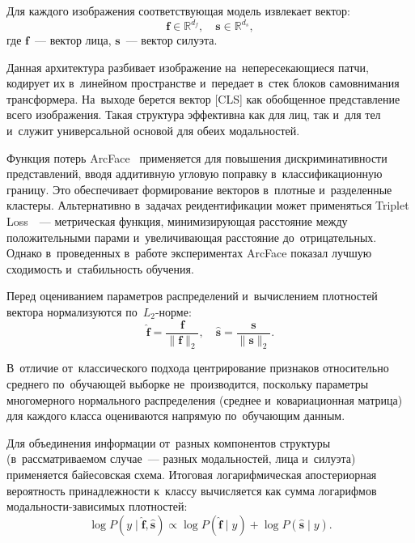 Для каждого изображения соответствующая модель извлекает вектор:
\begin{equation}\label{eq:ch2/embed}
    \mathbf{f}\in\mathbb{R}^{d_f},\quad \mathbf{s}\in\mathbb{R}^{d_s},
\end{equation}
где $\mathbf{f}$~--- вектор лица, $\mathbf{s}$~--- вектор силуэта.

Данная архитектура разбивает изображение на~непересекающиеся патчи,
кодирует их в~линейном пространстве и~передает в~стек
блоков самовнимания трансформера. На~выходе берется вектор [CLS]
как обобщенное представление всего изображения. Такая структура
эффективна как для лиц, так и~для тел и~служит универсальной
основой для обеих модальностей.

Функция потерь ArcFace~\cite{Deng2019arcface} применяется для
повышения дискриминативности представлений, вводя аддитивную угловую
поправку в~классификационную границу. Это обеспечивает формирование
векторов в~плотные и~разделенные кластеры. Альтернативно в~задачах
реидентификации может применяться Triplet
Loss~\cite{Hermans2017triplet}~--- метрическая функция, минимизирующая
расстояние между положительными парами и~увеличивающая расстояние
до~отрицательных. Однако в~проведенных в~работе экспериментах ArcFace
показал лучшую сходимость и~стабильность обучения.

Перед оцениванием параметров распределений и~вычислением плотностей вектора нормализуются по~$L_2$-норме:
\begin{equation}\label{eq:ch2/l2norm}
    \hat{\mathbf{f}}=\frac{\mathbf{f}}{\lVert\mathbf{f}\rVert_2},\quad \hat{\mathbf{s}}=\frac{\mathbf{s}}{\lVert\mathbf{s}\rVert_2}.
\end{equation}

В~отличие от~классического подхода центрирование признаков
относительно среднего по~обучающей выборке не~производится, поскольку
параметры многомерного нормального распределения (среднее
и~ковариационная матрица) для каждого класса оцениваются напрямую
по~обучающим данным.

Для объединения информации от~разных компонентов структуры
(в~рассматриваемом случае~--- разных модальностей, лица и~силуэта)
применяется байесовская схема. Итоговая логарифмическая апостериорная
вероятность принадлежности к~классу вычисляется как сумма логарифмов
модальности-зависимых плотностей:
\begin{equation}\label{eq:ch2/log-posterior}
    \log P(y\mid\hat{\mathbf{f}},\hat{\mathbf{s}})\propto\log P(\hat{\mathbf{f}}\mid y)+\log P(\hat{\mathbf{s}}\mid y).
\end{equation}

